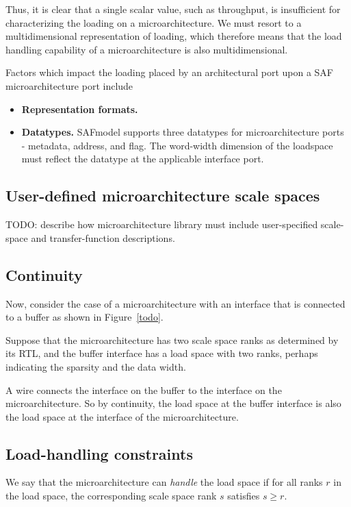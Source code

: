 Thus, it is clear that a single scalar value, such as throughput, is insufficient for characterizing the loading on a microarchitecture. We must resort to a multidimensional representation of loading, which therefore means that the load handling capability of a microarchitecture is also multidimensional.

Factors which impact the loading placed by an architectural port upon a SAF microarchitecture port include

\begin{itemize}
    \item \textbf{Representation formats.}
    \item \textbf{Datatypes.} SAFmodel supports three datatypes for microarchitecture ports - metadata, address, and flag. The word-width dimension of the loadspace must reflect the datatype at the applicable interface port.
\end{itemize}

\subsection{User-defined microarchitecture scale spaces}

TODO: describe how microarchitecture library must include user-specified scale-space and transfer-function descriptions.

\subsection{Continuity}

Now, consider the case of a microarchitecture with an interface that is connected to a buffer as shown in Figure~\ref{todo}.

Suppose that the microarchitecture has two scale space ranks as determined by its RTL, and the buffer interface has a load space with two ranks, perhaps indicating the sparsity and the data width.

A wire connects the interface on the buffer to the interface on the microarchitecture. So by continuity, the load space at the buffer interface is also the load space at the interface of the microarchitecture.

\subsection{Load-handling constraints}

We say that the microarchitecture can \textit{handle} the load space if for all ranks $r$ in the load space, the corresponding scale space rank $s$ satisfies $s \geq r$.

